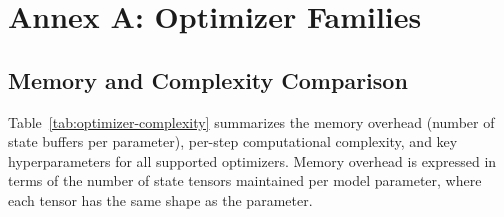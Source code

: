 \section{Annex A: Optimizer Families}
\label{sec:annex-optimizers}

\subsection{Memory and Complexity Comparison}

Table~\ref{tab:optimizer-complexity} summarizes the memory overhead (number of state buffers per parameter), per-step computational complexity, and key hyperparameters for all supported optimizers. Memory overhead is expressed in terms of the number of state tensors maintained per model parameter, where each tensor has the same shape as the parameter.

